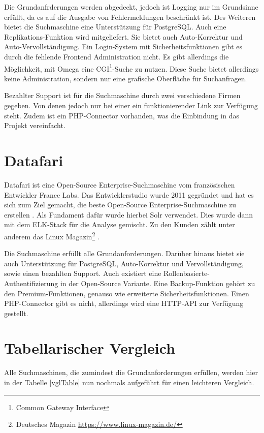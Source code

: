 Die Grundanfrderungen werden abgedeckt, jedoch ist Logging nur im Grundsinne erfüllt, da es auf die Ausgabe von Fehlermeldungen beschränkt ist. Des Weiteren bietet die Suchmaschine eine Unterstützung für PostgreSQL. Auch eine Replikations-Funktion wird mitgeliefert. Sie bietet auch Auto-Korrektur und Auto-Vervollständigung. Ein Login-System mit Sicherheitsfunktionen gibt es durch die fehlende Frontend Administration nicht. Es gibt allerdings die Möglichkeit, mit Omega eine CGI\footnote{Common Gateway Interface}-Suche zu nutzen. Diese Suche bietet allerdings keine Administration, sondern nur eine grafische Oberfläche für Suchanfragen.

Bezahlter Support ist für die Suchmaschine durch zwei verschiedene Firmen gegeben. Von denen jedoch nur bei einer ein funktionierender Link zur Verfügung steht. Zudem ist ein PHP-Connector vorhanden, was die Einbindung in das Projekt vereinfacht. \cite{XAP.2019}

\section{Datafari}
\label{datafari}

Datafari ist eine Open-Source Enterprise-Suchmaschine vom französischen Entwickler France Labs. Das Entwicklerstudio wurde 2011 gegründet und hat es sich zum Ziel gemacht, die beste Open-Source Enterprise-Suchmaschine zu erstellen \cite{Labs.2019}. Als Fundament dafür wurde hierbei Solr verwendet. Dies wurde dann mit dem ELK-Stack für die Analyse gemischt. Zu den Kunden zählt unter anderem das Linux Magazin\footnote{Deutsches Magazin \url{https://www.linux-magazin.de/}} \cite{MichaelBrandenburg.2019}. 

Die Suchmaschine erfüllt alle Grundanforderungen. Darüber hinaus bietet sie auch Unterstützung für PostgreSQL, Auto-Korrektur und Vervollständigung, sowie einen bezahlten Support. Auch existiert eine Rollenbasierte-Authentifizierung in der Open-Source Variante. Eine Backup-Funktion gehört zu den Premium-Funktionen, genauso wie erweiterte Sicherheitsfunktionen. Einen PHP-Connector gibt es nicht, allerdings wird eine HTTP-API zur Verfügung gestellt. \cite{Labs.b}

\newpage
\section{Tabellarischer Vergleich}

Alle Suchmaschinen, die zumindest die Grundanforderungen erfüllen, werden hier in der Tabelle \ref{vglTable} nun nochmals aufgeführt für einen leichteren Vergleich.

